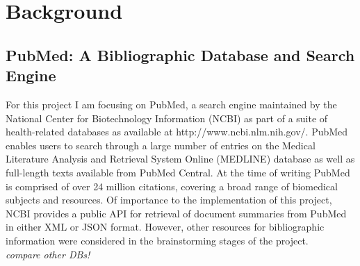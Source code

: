 \documentclass[PROP_AGutteridge_CS.tex]{subfiles}
\begin{document}
\chapter{Background}
\section{PubMed: A Bibliographic Database and Search Engine}
\par
For this project I am focusing on PubMed, a search engine maintained by the National Center for Biotechnology Information (NCBI) as part of a suite of health-related databases as available at http://www.ncbi.nlm.nih.gov/. PubMed enables users to search through a large number of entries on the Medical Literature Analysis and Retrieval System Online (MEDLINE) database as well as full-length texts available from PubMed Central. At the time of writing PubMed is comprised of over 24 million citations, covering a broad range of biomedical subjects and resources. Of importance to the implementation of this project, NCBI provides a public API for retrieval of document summaries from PubMed in either XML or JSON format. However, other resources for bibliographic information were considered in the brainstorming stages of the project. \\
\newline
\emph{compare other DBs!}

\end{document}
